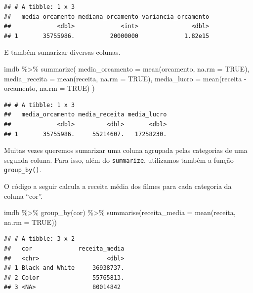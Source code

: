 \documentclass[
]{book}
\newenvironment{Shaded}{\begin{snugshade}}{\end{snugshade}}
\newcommand{\AttributeTok}[1]{\textcolor[rgb]{0.77,0.63,0.00}{#1}}
\newcommand{\ConstantTok}[1]{\textcolor[rgb]{0.00,0.00,0.00}{#1}}
\newcommand{\FunctionTok}[1]{\textcolor[rgb]{0.00,0.00,0.00}{#1}}
\newcommand{\NormalTok}[1]{#1}
\newcommand{\SpecialCharTok}[1]{\textcolor[rgb]{0.00,0.00,0.00}{#1}}
\begin{document}
\begin{verbatim}
## # A tibble: 1 x 3
##   media_orcamento mediana_orcamento variancia_orcamento
##             <dbl>             <int>               <dbl>
## 1       35755986.          20000000             1.82e15
\end{verbatim}

E também sumarizar diversas colunas.

\begin{Shaded}
\begin{Highlighting}[]
\NormalTok{imdb }\SpecialCharTok{\%\textgreater{}\%} \FunctionTok{summarize}\NormalTok{(}
  \AttributeTok{media\_orcamento =} \FunctionTok{mean}\NormalTok{(orcamento, }\AttributeTok{na.rm =} \ConstantTok{TRUE}\NormalTok{),}
  \AttributeTok{media\_receita =} \FunctionTok{mean}\NormalTok{(receita, }\AttributeTok{na.rm =} \ConstantTok{TRUE}\NormalTok{),}
  \AttributeTok{media\_lucro =} \FunctionTok{mean}\NormalTok{(receita }\SpecialCharTok{{-}}\NormalTok{ orcamento, }\AttributeTok{na.rm =} \ConstantTok{TRUE}\NormalTok{)}
\NormalTok{)}
\end{Highlighting}
\end{Shaded}

\begin{verbatim}
## # A tibble: 1 x 3
##   media_orcamento media_receita media_lucro
##             <dbl>         <dbl>       <dbl>
## 1       35755986.     55214607.   17258230.
\end{verbatim}

Muitas vezes queremos sumarizar uma coluna agrupada pelas categorias de uma segunda coluna. Para isso, além do \texttt{summarize}, utilizamos também a função \texttt{group\_by()}.

O código a seguir calcula a receita média dos filmes para cada categoria da coluna ``cor''.

\begin{Shaded}
\begin{Highlighting}[]
\NormalTok{imdb }\SpecialCharTok{\%\textgreater{}\%} 
  \FunctionTok{group\_by}\NormalTok{(cor) }\SpecialCharTok{\%\textgreater{}\%} 
  \FunctionTok{summarise}\NormalTok{(}\AttributeTok{receita\_media =} \FunctionTok{mean}\NormalTok{(receita, }\AttributeTok{na.rm =} \ConstantTok{TRUE}\NormalTok{))}
\end{Highlighting}
\end{Shaded}

\begin{verbatim}
## # A tibble: 3 x 2
##   cor             receita_media
##   <chr>                   <dbl>
## 1 Black and White     36938737.
## 2 Color               55765813.
## 3 <NA>                80014842
\end{verbatim}
\end{document}
